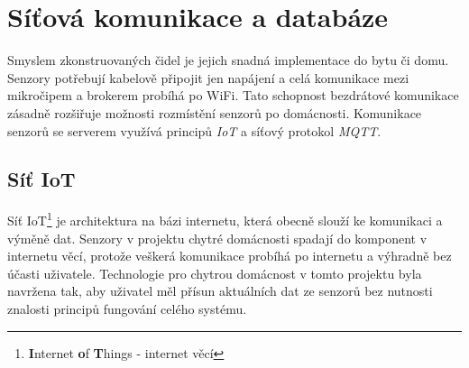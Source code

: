 \chapter{Síťová komunikace a databáze} \label{chap:methods}
Smyslem zkonstruovaných čidel je jejich snadná implementace do bytu či domu. Senzory potřebují kabelově připojit jen napájení a celá komunikace mezi mikročipem a brokerem probíhá po WiFi. Tato schopnost bezdrátové komunikace zásadně rozšiřuje možnosti rozmístění senzorů po domácnosti. Komunikace senzorů se serverem využívá principů \textit{IoT} a síťový protokol \textit{MQTT}. 

\section*{Síť IoT} \label{sec:iot}
Síť IoT\footnote{\textbf{I}nternet \textbf{o}f \textbf{T}hings - internet věcí} je architektura na bázi internetu, která obecně slouží ke komunikaci a výměně dat. Senzory v projektu chytré domácnosti spadají do komponent v internetu věcí, protože veškerá komunikace probíhá po internetu a výhradně bez účasti uživatele. Technologie pro chytrou domácnost v tomto projektu byla navržena tak, aby uživatel měl přísun aktuálních dat ze senzorů bez nutnosti znalosti principů fungování celého systému.

